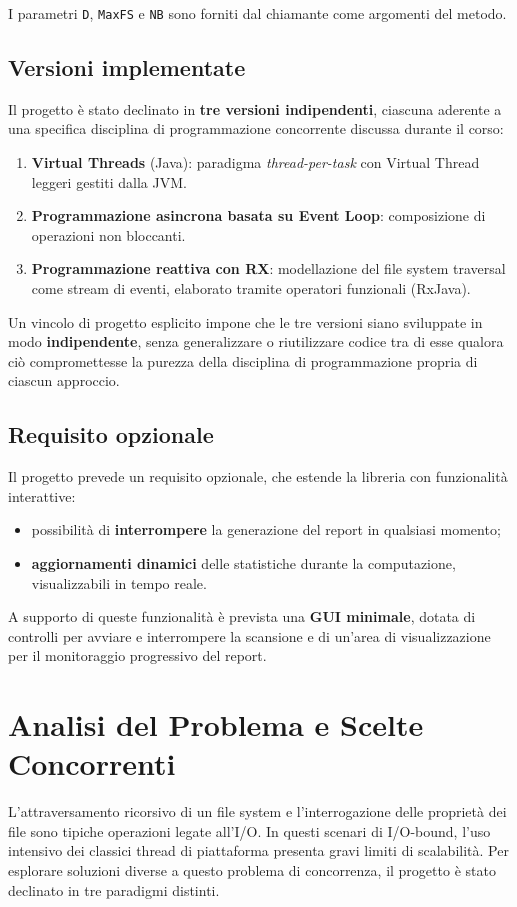 \documentclass[11pt,a4paper]{article}
\begin{document}
I parametri \texttt{D}, \texttt{MaxFS} e \texttt{NB} sono forniti dal chiamante come argomenti del metodo.

\subsection*{Versioni implementate}

Il progetto è stato declinato in \textbf{tre versioni indipendenti}, ciascuna aderente a una specifica disciplina di programmazione concorrente discussa durante il corso:

\begin{enumerate}
    \item \textbf{Virtual Threads} (Java): paradigma \textit{thread-per-task} con Virtual Thread leggeri gestiti dalla JVM.
    \item \textbf{Programmazione asincrona basata su Event Loop}: composizione di operazioni non bloccanti.
    \item \textbf{Programmazione reattiva con RX}: modellazione del file system traversal come stream di eventi, elaborato tramite operatori funzionali (RxJava).
\end{enumerate}

Un vincolo di progetto esplicito impone che le tre versioni siano sviluppate in modo \textbf{indipendente}, senza generalizzare o riutilizzare codice tra di esse qualora ciò compromettesse la purezza della disciplina di programmazione propria di ciascun approccio.

\subsection*{Requisito opzionale}

Il progetto prevede un requisito opzionale, che estende la libreria con funzionalità interattive:

\begin{itemize}
    \item possibilità di \textbf{interrompere} la generazione del report in qualsiasi momento;
    \item \textbf{aggiornamenti dinamici} delle statistiche durante la computazione, visualizzabili in tempo reale.
\end{itemize}

A supporto di queste funzionalità è prevista una \textbf{GUI minimale}, dotata di controlli per avviare e interrompere la scansione e di un'area di visualizzazione per il monitoraggio progressivo del report.
\section{Analisi del Problema e Scelte Concorrenti}
L'attraversamento ricorsivo di un file system e l'interrogazione delle proprietà dei file sono tipiche operazioni legate all'I/O. In questi scenari di I/O-bound, l'uso intensivo dei classici thread di piattaforma presenta gravi limiti di scalabilità. Per esplorare soluzioni diverse a questo problema di concorrenza, il progetto è stato declinato in tre paradigmi distinti.
\end{document}
